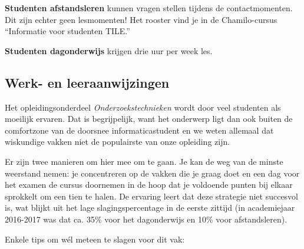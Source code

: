 \textbf{Studenten afstandsleren} kunnen vragen stellen tijdens de contactmomenten. Dit zijn echter geen lesmomenten! Het rooster vind je in de Chamilo-cursus ``Informatie voor studenten TILE.''

\textbf{Studenten dagonderwijs} krijgen drie uur per week les.

\subsection{Werk- en leeraanwijzingen}

Het opleidingsonderdeel \emph{Onderzoekstechnieken} wordt door veel studenten als moeilijk ervaren. Dat is begrijpelijk, want het onderwerp ligt dan ook buiten de comfortzone van de doorsnee informaticastudent en we weten allemaal dat wiskundige vakken niet de populairste van onze opleiding zijn.

Er zijn twee manieren om hier mee om te gaan. Je kan de weg van de minste weerstand nemen: je concentreren op de vakken die je graag doet en een dag voor het examen de cursus doornemen in de hoop dat je voldoende punten bij elkaar sprokkelt om een tien te halen. De ervaring leert dat deze strategie niet succesvol is, wat blijkt uit het lage slagingspercentage in de eerste zittijd (in academiejaar 2016-2017 was dat ca. 35\% voor het dagonderwijs en 10\% voor afstandsleren).

Enkele tips om wél meteen te slagen voor dit vak:

